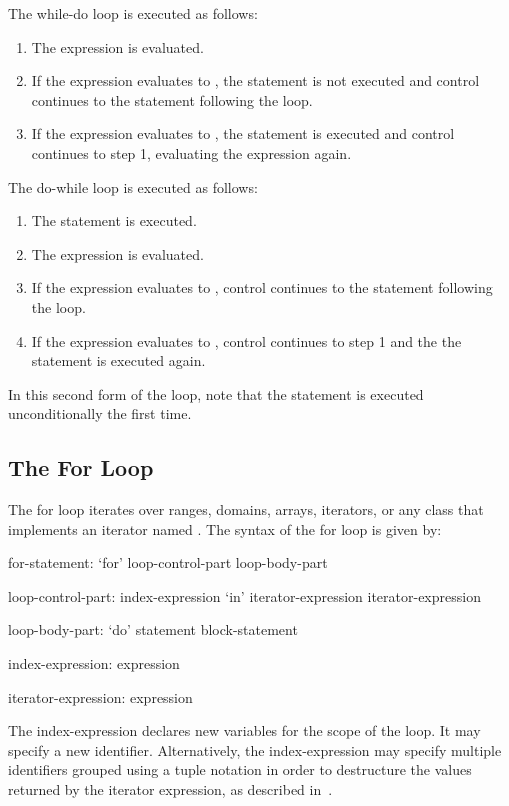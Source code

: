 The while-do loop is executed as follows:
\begin{enumerate}
\item The expression is evaluated.
\item If the expression evaluates to , the statement is
  not executed and control continues to the statement following the
  loop.
\item If the expression evaluates to , the statement is
  executed and control continues to step 1, evaluating the expression
  again.
\end{enumerate}

The do-while loop is executed as follows:
\begin{enumerate}
\item The statement is executed.
\item The expression is evaluated.
\item If the expression evaluates to , control continues
  to the statement following the loop.
\item If the expression evaluates to , control continues to
  step 1 and the the statement is executed again.
\end{enumerate}
In this second form of the loop, note that the statement is executed
unconditionally the first time.

\subsection{The For Loop}
\label{The_For_Loop}


The for loop iterates over ranges, domains, arrays, iterators, or any
class that implements an iterator named .  The syntax of
the for loop is given by:
\begin{syntax}
for-statement:
  `for' loop-control-part loop-body-part

loop-control-part:
  index-expression `in' iterator-expression
  iterator-expression

loop-body-part:
  `do' statement
  block-statement

index-expression:
  expression

iterator-expression:
  expression
\end{syntax}

The index-expression declares new variables for the scope of the loop.
It may specify a new identifier.  Alternatively, the index-expression
may specify multiple identifiers grouped using a tuple notation in
order to destructure the values returned by the iterator expression,
as described in~.

